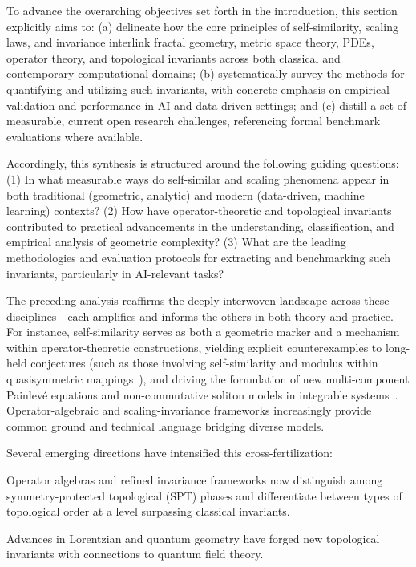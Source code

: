 \documentclass[sigconf]{acmart}
\begin{document}
To advance the overarching objectives set forth in the introduction, this section explicitly aims to: (a) delineate how the core principles of self-similarity, scaling laws, and invariance interlink fractal geometry, metric space theory, PDEs, operator theory, and topological invariants across both classical and contemporary computational domains; (b) systematically survey the methods for quantifying and utilizing such invariants, with concrete emphasis on empirical validation and performance in AI and data-driven settings; and (c) distill a set of measurable, current open research challenges, referencing formal benchmark evaluations where available.

Accordingly, this synthesis is structured around the following guiding questions: (1) In what measurable ways do self-similar and scaling phenomena appear in both traditional (geometric, analytic) and modern (data-driven, machine learning) contexts? (2) How have operator-theoretic and topological invariants contributed to practical advancements in the understanding, classification, and empirical analysis of geometric complexity? (3) What are the leading methodologies and evaluation protocols for extracting and benchmarking such invariants, particularly in AI-relevant tasks?

The preceding analysis reaffirms the deeply interwoven landscape across these disciplines---each amplifies and informs the others in both theory and practice. For instance, self-similarity serves as both a geometric marker and a mechanism within operator-theoretic constructions, yielding explicit counterexamples to long-held conjectures (such as those involving self-similarity and modulus within quasisymmetric mappings~\cite{ref35}), and driving the formulation of new multi-component Painlevé equations and non-commutative soliton models in integrable systems~\cite{ref64}. Operator-algebraic and scaling-invariance frameworks increasingly provide common ground and technical language bridging diverse models.

Several emerging directions have intensified this cross-fertilization:

Operator algebras and refined invariance frameworks now distinguish among symmetry-protected topological (SPT) phases and differentiate between types of topological order at a level surpassing classical invariants.

Advances in Lorentzian and quantum geometry have forged new topological invariants with connections to quantum field theory.
\end{document}
